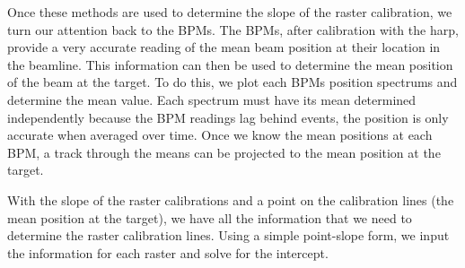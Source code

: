Once these methods are used to determine the slope of the raster calibration, we turn our attention back to the BPMs. The BPMs, after calibration with the harp, provide a very accurate reading of the mean beam position at their location in the beamline. This information can then be used to determine the mean position of the beam at the target. To do this, we plot each BPMs position spectrums and determine the mean value. Each spectrum must have its mean determined independently because the BPM readings lag behind events, the position is only accurate when averaged over time. Once we know the mean positions at each BPM, a track through the means can be projected to the mean position at the target.

With the slope of the raster calibrations and a point on the calibration lines (the mean position at the target), we have all the information that we need to determine the raster calibration lines. Using a simple point-slope form, we input the information for each raster and solve for the intercept.